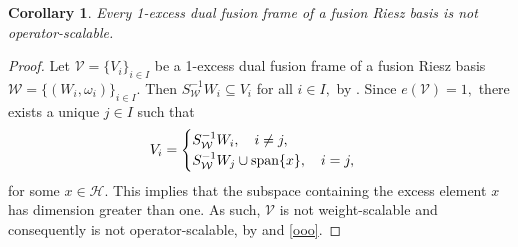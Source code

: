 \documentclass[sn-mathphys-num]{sn-jnl}%
\newtheorem{corollary}[theorem]{Corollary}
\theoremstyle{definition}
\theoremstyle{remark}
\numberwithin{equation}{section}
\begin{document}
\begin{corollary}
Every 1-excess dual fusion frame of a fusion Riesz basis is not operator-scalable.
\end{corollary}

\begin{proof}
Let $\mathcal{V}=\{V_{i}\}_{i \in I} $ be a 1-excess dual fusion frame of a fusion Riesz basis $\mathcal{W}=\{(W_{i},\omega_{i})\}_{i \in I} .$ Then $S_{\mathcal{W}}^{-1}W_{i}\subseteq V_{i}$ for all $i \in I,$ by \cite[Corollary 2.6]{Arabyani dual}. Since $e(\mathcal{V})=1,$ there exists a unique $j \in I$ such that 
\begin{align*}
V_{i}= \begin{cases}
S_{\mathcal{W}}^{-1}W_{i}, \quad  i \neq j, 
\\ S_{\mathcal{W}}^{-1}W_{j} \cup \textnormal{span}\{x\}, \quad  i = j, 
\end{cases}
\end{align*}
for some $x \in \mathcal {H}.$ This implies that the subspace containing the excess element $x$ has dimension greater than one. As such, $\mathcal{V}$ is not weight-scalable and consequently is not operator-scalable, by \cite[Theorem 3.6]{scaling weights} and \eqref{ooo}.
\end{proof}
\end{document}
